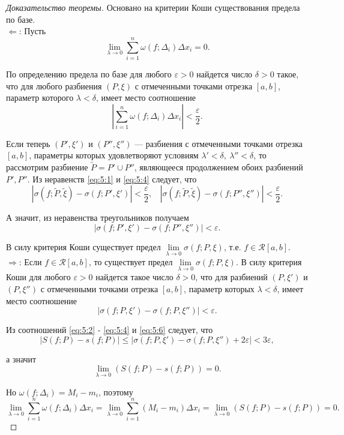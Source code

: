 \documentclass[12pt]{article}
\numberwithin{equation}{section}
\begin{document}
\begin{proof}[Доказательство теоремы] Основано на критерии Коши существования предела по базе.\\

$\Leftarrow$: Пусть
\[ \lim_{\lambda \to 0} \sum_{i=1}^n \omega(f; \Delta_i) \Delta x_i = 0.\]

По определению предела по базе для любого $\varepsilon > 0$ найдется число $\delta > 0$ такое, что для любого разбиения $(P, \xi)$ с отмеченными точками отрезка $[a,b]$, параметр которого $\lambda < \delta$, имеет место соотношение
\begin{equation} \label{eq:5:5}
\left| \sum_{i=1}^n \omega(f; \Delta_i) \Delta x_i\right| < \frac{\varepsilon}{2}.
\end{equation}

Если теперь $(P', \xi')$ и $(P'', \xi'')$  --- разбиения с отмеченными точками отрезка $[a,b]$, параметры которых удовлетворяют условиям $\lambda' < \delta,~ \lambda'' < \delta$, то рассмотрим разбиение $\tilde{P} = P' \cup P''$, являющееся продолжением обоих разбиений $P', P''$. Из неравенств \eqref{eq:5:1} и \eqref{eq:5:4} следует, что
\[ \left|\sigma(f; \tilde{P}, \tilde{\xi}) - \sigma(f; P', \xi') \right| < \frac{\varepsilon}{2}, ~~~~ \left|\sigma(f; \tilde{P}, \tilde{\xi}) - \sigma(f; P'', \xi'')\right| < \frac{\varepsilon}{2}. \]

А значит, из неравенства треугольников получаем
\[ \left| \sigma(f; P', \xi') - \sigma(f; P'', \xi'')\right| < \varepsilon.\]

В силу критерия Коши существует предел $\lim\limits_{\lambda \to 0} \sigma(f; P, \xi)$, т.е. $f \in \mathcal{R}[a,b]$.\\

$\Rightarrow$: Если  $f \in \mathcal{R}[a,b]$, то существует предел  $\lim\limits_{\lambda \to 0} \sigma(f; P, \xi)$. В силу критерия Коши для любого $\varepsilon > 0$ найдется такое число $\delta > 0$, что для разбиений $(P, \xi')$ и $(P, \xi'')$ с отмеченными точками отрезка $[a,b]$, параметр которых $\lambda < \delta$, имеет место соотношение
\begin{equation} \label{eq:5:6}
\left| \sigma(f;P, \xi') - \sigma(f;P, \xi'')\right| < \varepsilon.
\end{equation}


Из соотношений \eqref{eq:5:2} - \eqref{eq:5:4} и \eqref{eq:5:6} следует, что
\[ \left| S(f;P) - s(f;P)\right| \leqslant | \sigma(f;P, \xi') - \sigma(f; P, \xi'') + 2 \varepsilon | < 3 \varepsilon,\]

а значит
\[ \lim_{\lambda \to 0} \left( S(f;P) - s(f;P)\right) = 0.\]

Но $\omega(f;\Delta_i) = M_i - m_i$, поэтому
\[ \lim_{\lambda \to 0} \sum_{i = 1}^n \omega(f; \Delta_i) \Delta x_i =  \lim_{\lambda \to 0} \sum_{i = 1}^n (M_i - m_i) \Delta x_i =\lim_{\lambda \to 0} \left( S(f;P) - s(f;P)\right) = 0.\]
\end{proof}
\end{document}
